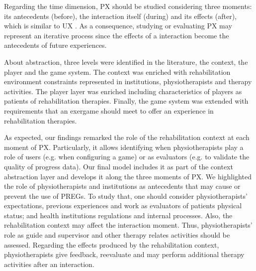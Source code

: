 Regarding the time dimension, \ac{PX} should be studied considering three moments: its antecedents (before), the interaction itself (during) and its effects (after), which is similar to \ac{UX} \autocite{iso9241:210}. As a consequence, studying or evaluating \ac{PX} may represent an iterative process since the effects of a interaction become the antecedents of future experiences.

About abstraction, three levels were identified in the literature, the context, the player and the game system. The context was enriched with rehabilitation environment constraints represented in institutions, physiotherapists and therapy activities. The player layer was enriched including characteristics of players as patients of rehabilitation therapies. Finally, the game system was extended with requirements that an exergame should meet to offer an experience in rehabilitation therapies.

As expected, our findings remarked the role of the rehabilitation context at each moment of \ac{PX}. Particularly, it allows identifying when physiotherapists play a role of users (e.g. when configuring a game) or as evaluators (e.g. to validate the quality of progress data). Our final model includes it as part of the context abstraction layer and develops it along the three moments of \ac{PX}. We highlighted the role of physiotherapists and institutions as antecedents that may cause or prevent the use of \acp{PREG}. To study that, one should consider physiotherapists' expectations, previous experiences and work as evaluators of patients physical status; and health institutions regulations and internal processes. Also, the rehabilitation context may affect the interaction moment. Thus, physiotherapists' role as guide and supervisor and other therapy relates activities should be assessed. Regarding the effects produced by the rehabilitation context, physiotherapists give feedback, reevaluate and may perform additional therapy activities after an interaction.


